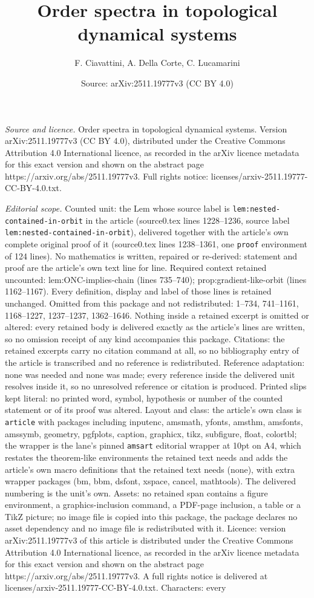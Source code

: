 \documentclass[10pt,a4paper]{amsart}
\title[Order spectra in topological dynamical systems]{Order spectra in topological dynamical systems}
\author{F. Ciavattini, A. Della Corte, C. Lucamarini}
\date{Source: arXiv:2511.19777v3 (CC BY 4.0)}
\begin{document}
\maketitle

\noindent\emph{Source and licence.} Order spectra in topological dynamical systems. Version arXiv:2511.19777v3 (CC BY 4.0), distributed under the Creative Commons Attribution 4.0 International licence, as recorded in the arXiv licence metadata for this exact version and shown on the abstract page https://arxiv.org/abs/2511.19777v3. Full rights notice: licenses/arxiv-2511.19777-CC-BY-4.0.txt.\par\smallskip

\noindent\textit{Editorial scope.} Counted unit: the Lem whose source label is \texttt{lem:nested-contained-in-orbit} in the article (source0.tex lines 1228--1236, source label \texttt{lem:nested-contained-in-orbit}), delivered together with the article's own complete original proof of it (source0.tex lines 1238--1361, one \texttt{proof} environment of 124 lines). No mathematics is written, repaired or re-derived: statement and proof are the article's own text line for line. Required context retained uncounted: lem:ONC-implies-chain (lines 735--740); prop:gradient-like-orbit (lines 1162--1167). Every definition, display and label of those lines is retained unchanged. Omitted from this package and not redistributed: 1--734, 741--1161, 1168--1227, 1237--1237, 1362--1646. Nothing inside a retained excerpt is omitted or altered: every retained body is delivered exactly as the article's lines are written, so no omission receipt of any kind accompanies this package. Citations: the retained excerpts carry no citation command at all, so no bibliography entry of the article is transcribed and no reference is redistributed. Reference adaptation: none was needed and none was made; every reference inside the delivered unit resolves inside it, so no unresolved reference or citation is produced. Printed slips kept literal: no printed word, symbol, hypothesis or number of the counted statement or of its proof was altered. Layout and class: the article's own class is \texttt{article} with packages including inputenc, amsmath, yfonts, amsthm, amsfonts, amssymb, geometry, pgfplots, caption, graphicx, tikz, subfigure, float, colortbl; the wrapper is the lane's pinned \texttt{amsart} editorial wrapper at 10pt on A4, which restates the theorem-like environments the retained text needs and adds the article's own macro definitions that the retained text needs (none), with extra wrapper packages (bm, bbm, dsfont, xspace, cancel, mathtools). The delivered numbering is the unit's own. Assets: no retained span contains a figure environment, a graphics-inclusion command, a PDF-page inclusion, a table or a TikZ picture; no image file is copied into this package, the package declares no asset dependency and no image file is redistributed with it. Licence: version arXiv:2511.19777v3 of this article is distributed under the Creative Commons Attribution 4.0 International licence, as recorded in the arXiv licence metadata for this exact version and shown on the abstract page https://arxiv.org/abs/2511.19777v3. A full rights notice is delivered at licenses/arxiv-2511.19777-CC-BY-4.0.txt. Characters: every 
\end{document}
